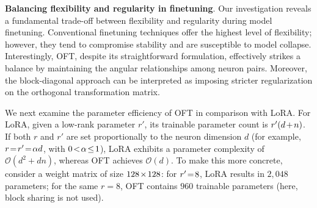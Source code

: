 \begin{itemize}[leftmargin=*,nosep]
\textbf{Balancing flexibility and regularity in finetuning}. Our investigation reveals a fundamental trade-off between flexibility and regularity during model finetuning. Conventional finetuning techniques offer the highest level of flexibility; however, they tend to compromise stability and are susceptible to model collapse. Interestingly, OFT, despite its straightforward formulation, effectively strikes a balance by maintaining the angular relationships among neuron pairs. Moreover, the block-diagonal approach can be interpreted as imposing stricter regularization on the orthogonal transformation matrix.

We next examine the parameter efficiency of OFT in comparison with LoRA. For LoRA, given a low-rank parameter $r'$, its trainable parameter count is $\thickmuskip=2mu \medmuskip=2mu r'(d+n)$. If both $r$ and $r'$ are set proportionally to the neuron dimension $d$ (for example, $\thickmuskip=2mu \medmuskip=2mu r = r' = \alpha d$, with $\thickmuskip=2mu \medmuskip=2mu 0<\alpha\leq 1$), LoRA exhibits a parameter complexity of $\mathcal{O}(d^2+dn)$, whereas OFT achieves $\mathcal{O}(d)$. To make this more concrete, consider a weight matrix of size $\thickmuskip=2mu \medmuskip=2mu 128\times 128$: for $\thickmuskip=2mu \medmuskip=2mu r' = 8$, LoRA results in $2{,}048$ parameters; for the same $r = 8$, OFT contains $960$ trainable parameters (here, block sharing is not used).


\end{itemize}
